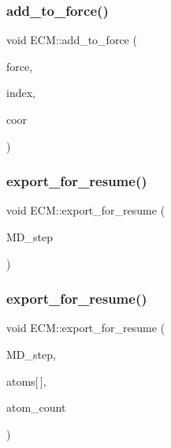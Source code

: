 \subsubsection{\texorpdfstring{add\_to\_force()}{add\_to\_force()}}
{\footnotesize\ttfamily void E\+C\+M\+::add\+\_\+to\+\_\+force (\begin{DoxyParamCaption}\item[{double}]{force,  }\item[{int}]{index,  }\item[{int}]{coor }\end{DoxyParamCaption})\hspace{0.3cm}{\ttfamily [inline]}}

\mbox{\label{classECM_ae6164ca0ddd7fa532b2a64fd763d34ff}} 
\subsubsection{\texorpdfstring{export\_for\_resume()}{export\_for\_resume()}\hspace{0.1cm}{\footnotesize\ttfamily [1/2]}}
{\footnotesize\ttfamily void E\+C\+M\+::export\+\_\+for\+\_\+resume (\begin{DoxyParamCaption}\item[{int}]{M\+D\+\_\+step }\end{DoxyParamCaption})}

\mbox{\label{classECM_a1f9ee2b79c7cf98efe72a4e74ff7916f}} 
\subsubsection{\texorpdfstring{export\_for\_resume()}{export\_for\_resume()}\hspace{0.1cm}{\footnotesize\ttfamily [2/2]}}
{\footnotesize\ttfamily void E\+C\+M\+::export\+\_\+for\+\_\+resume (\begin{DoxyParamCaption}\item[{int}]{M\+D\+\_\+step,  }\item[{\mbox{\hyperlink{structMyAtomInfo}{My\+Atom\+Info}}}]{atoms\mbox{[}$\,$\mbox{]},  }\item[{int}]{atom\+\_\+count }\end{DoxyParamCaption})}

